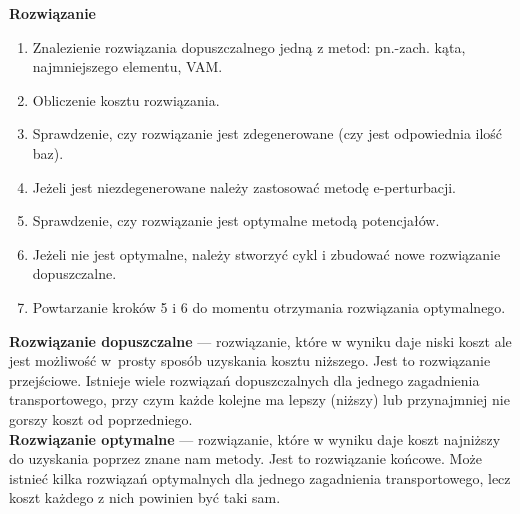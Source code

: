 \documentclass[10pt, a
4paper]{article}
\begin{document}
\noindent \textbf{Rozwiązanie}
\begin{enumerate}
\item Znalezienie rozwiązania dopuszczalnego jedną z metod: pn.-zach. kąta, najmniejszego elementu, VAM.
\item Obliczenie kosztu rozwiązania.
\item Sprawdzenie, czy rozwiązanie jest zdegenerowane (czy jest odpowiednia ilość baz).
\item Jeżeli jest niezdegenerowane należy zastosować metodę e-perturbacji.
\item Sprawdzenie, czy rozwiązanie jest optymalne metodą potencjałów.
\item Jeżeli nie jest optymalne, należy stworzyć cykl i zbudować nowe rozwiązanie dopuszczalne.
\item Powtarzanie kroków 5 i 6 do momentu otrzymania rozwiązania optymalnego.
\end{enumerate}
\textbf{Rozwiązanie dopuszczalne} --- rozwiązanie, które w wyniku daje niski koszt ale jest możliwość w~prosty sposób uzyskania kosztu niższego. Jest to rozwiązanie przejściowe. Istnieje wiele rozwiązań dopuszczalnych dla jednego zagadnienia transportowego, przy czym każde kolejne ma lepszy (niższy) lub przynajmniej nie gorszy koszt od poprzedniego.
\\
\textbf{Rozwiązanie optymalne} --- rozwiązanie, które w wyniku daje koszt najniższy do uzyskania poprzez znane nam metody. Jest to rozwiązanie końcowe. Może istnieć kilka rozwiązań optymalnych dla jednego zagadnienia transportowego, lecz koszt każdego z nich powinien być taki sam. 




\newpage
\end{document}

